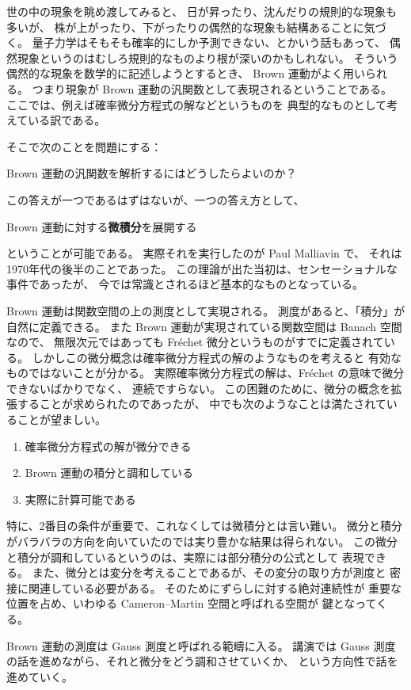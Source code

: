 \documentclass[uplatex,dvipdfmx]{jlreq}
\begin{document}
\bigskip

世の中の現象を眺め渡してみると、
日が昇ったり、沈んだりの規則的な現象も多いが、
株が上がったり、下がったりの偶然的な現象も結構あることに気づく。
量子力学はそもそも確率的にしか予測できない、とかいう話もあって、
偶然現象というのはむしろ規則的なものより根が深いのかもしれない。
そういう偶然的な現象を数学的に記述しようとするとき、
Brown 運動がよく用いられる。
つまり現象が Brown 運動の汎関数として表現されるということである。
ここでは、例えば確率微分方程式の解などというものを
典型的なものとして考えている訳である。

そこで次のことを問題にする：
\begin{center}
Brown 運動の汎関数を解析するにはどうしたらよいのか？
\end{center}
この答えが一つであるはずはないが、一つの答え方として、
\begin{center}
Brown 運動に対する{\bfseries 微積分}を展開する
\end{center}
ということが可能である。
実際それを実行したのが Paul Malliavin で、
それは1970年代の後半のことであった。
この理論が出た当初は、センセーショナルな事件であったが、
今では常識とされるほど基本的なものとなっている。

Brown 運動は関数空間の上の測度として実現される。
測度があると、「積分」が自然に定義できる。
また Brown 運動が実現されている関数空間は Banach 空間なので、
無限次元ではあっても Fréchet 微分というものがすでに定義されている。
しかしこの微分概念は確率微分方程式の解のようなものを考えると
有効なものではないことが分かる。
実際確率微分方程式の解は、Fréchet の意味で微分できないばかりでなく、
連続ですらない。
この困難のために、微分の概念を拡張することが求められたのであったが、
中でも次のようなことは満たされていることが望ましい。
\begin{enumerate}
\item 確率微分方程式の解が微分できる
\item Brown 運動の積分と調和している
\item 実際に計算可能である
\end{enumerate}
特に、2番目の条件が重要で、これなくしては微積分とは言い難い。
微分と積分がバラバラの方向を向いていたのでは実り豊かな結果は得られない。
この微分と積分が調和しているというのは、実際には部分積分の公式として
表現できる。
また、微分とは変分を考えることであるが、その変分の取り方が測度と
密接に関連している必要がある。
そのためにずらしに対する絶対連続性が
重要な位置を占め、いわゆる Cameron--Martin 空間と呼ばれる空間が
鍵となってくる。

Brown 運動の測度は Gauss 測度と呼ばれる範疇に入る。
講演では Gauss 測度の話を進めながら、それと微分をどう調和させていくか、
という方向性で話を進めていく。
\end{document}
